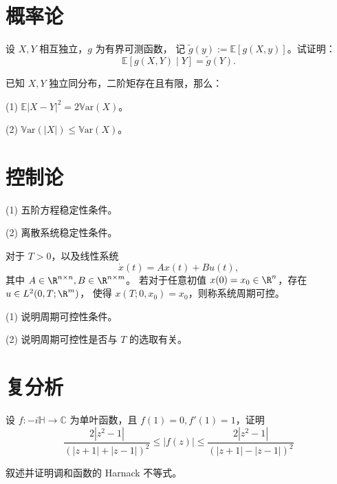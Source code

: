 \section{概率论}

\begin{problem}
设 \( X, Y \) 相互独立，\( g \) 为有界可测函数，
记 \(\tilde{g}(y) := \mathbb{E}[g(X, y)]\)。试证明：
\[
\mathbb{E}[g(X, Y) \mid Y] = \tilde{g}(Y).
\]
\end{problem}

\begin{problem}
已知 \( X, Y \) 独立同分布，二阶矩存在且有限，那么：

(1) \( \mathbb{E}|X - Y|^2 = 2\mathbb{V}\text{ar}(X) \)。

(2) \( \mathbb{V}\text{ar}(|X|) \leq \mathbb{V}\text{ar}(X) \)。
\end{problem}

\section{控制论}

\begin{problem}
(1) 五阶方程稳定性条件。  

(2) 离散系统稳定性条件。  
\end{problem}

\begin{problem}
对于 \( T > 0 \)，以及线性系统  
\[
\dot{x}(t) = Ax(t) + Bu(t),
\]  
其中 \( A \in \R^{n \times n}, B \in \R^{n \times m} \)。
若对于任意初值 \( x(0) = x_0 \in \R^n \)，存在 \( u \in L^2(0,T;\R^m) \)，
使得 \( x(T;0,x_0) = x_0 \)，则称系统周期可控。

(1) 说明周期可控性条件。  

(2) 说明周期可控性是否与 \( T \) 的选取有关。
\end{problem}

\section{复分析}

\begin{problem}
设 \( f: -i\mathbb{H} \to \mathbb{C} \) 为单叶函数，且 \( f(1) = 0, f'(1) = 1 \)，证明  
\[
\frac{2|z^2 - 1|}{(|z+1| + |z-1|)^2} \leq |f(z)| \leq \frac{2|z^2 - 1|}{(|z+1| - |z-1|)^2}
\]
\end{problem}

\begin{problem}
叙述并证明调和函数的 Harnack 不等式。
\end{problem}

